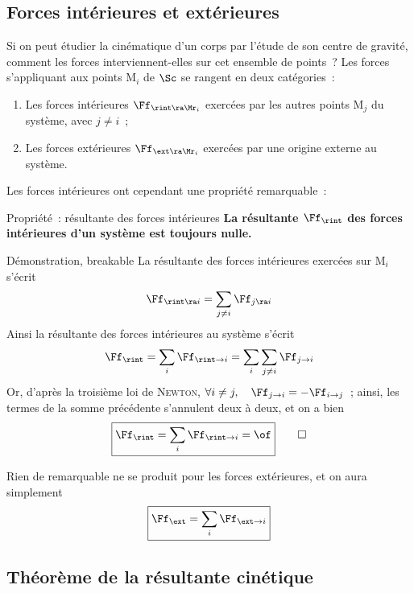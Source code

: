 \documentclass[../main/main.tex]{subfiles}
\begin{document}
\subsection{Forces intérieures et extérieures}
Si on peut étudier la cinématique d'un corps par l'étude de son centre de
gravité, comment les forces interviennent-elles sur cet ensemble de points~?
Les forces s'appliquant aux points M$_i$ de $\Sc$ se rangent en deux
catégories~:
\begin{enumerate}
    \item Les forces intérieures $\Ff_{\rint\ra\Mr_i}$ exercées par les autres
        points M$_j$ du système, avec $j\neq i$~;
    \item Les forces extérieures $\Ff_{\ext\ra\Mr_i}$ exercées par une origine
        externe au système.
\end{enumerate}
Les forces intérieures ont cependant une propriété remarquable~:
\begin{tprop}{Propriété~: résultante des forces intérieures}
    \centering\bfseries
    La résultante $\Ff_{\rint}$ des forces intérieures d'un système est toujours
    nulle.
\end{tprop}
\begin{tdemo}{Démonstration, breakable}
    La résultante des forces intérieures exercées sur M$_i$ s'écrit
    \[\Ff_{\rint\ra i} = \sum_{j\neq i}\Ff_{j\ra i}\]
    Ainsi la résultante des forces intérieures au système s'écrit
    \[\Ff_{\rint} = \sum_i \Ff_{\rint\to i} = \sum_i\sum_{j\neq i}\Ff_{j\to i}\]
    Or, d'après la troisième loi de \textsc{Newton}, $\forall i\neq j, \quad
    \Ff_{j\to i} = -\Ff_{i\to j}$~; ainsi, les termes de la somme précédente
    s'annulent deux à deux, et on a bien
    \begin{gather*}
        \boxed{\Ff_{\rint} = \sum_i\Ff_{\rint\to i} = \of}
        \qed
    \end{gather*}
\end{tdemo}
Rien de remarquable ne se produit pour les forces extérieures, et on aura
simplement
\[\boxed{\Ff_{\ext} = \sum_i \Ff_{\ext\to i}}\]

\subsection{Théorème de la résultante cinétique}
\end{document}
